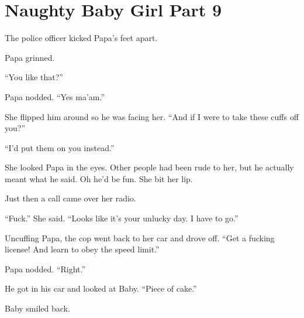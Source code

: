 \section{Naughty Baby Girl Part 9}

     The police officer kicked Papa’s feet apart.

    Papa grinned.

    “You like that?”

    Papa nodded. “Yes ma’am.”

    She flipped him around so he was facing her. “And if I were to take these cuffs off you?”

    “I’d put them on you instead.”

    She looked Papa in the eyes. Other people had been rude to her, but he actually meant what he said. Oh he’d be fun. She bit her lip.

    Just then a call came over her radio.

    “Fuck.” She said. “Looks like it’s your unlucky day. I have to go.”

    Uncuffing Papa, the cop went back to her car and drove off. “Get a fucking license! And learn to obey the speed limit.”

    Papa nodded. “Right.”

    He got in his car and looked at Baby. “Piece of cake.”

    Baby smiled back.

